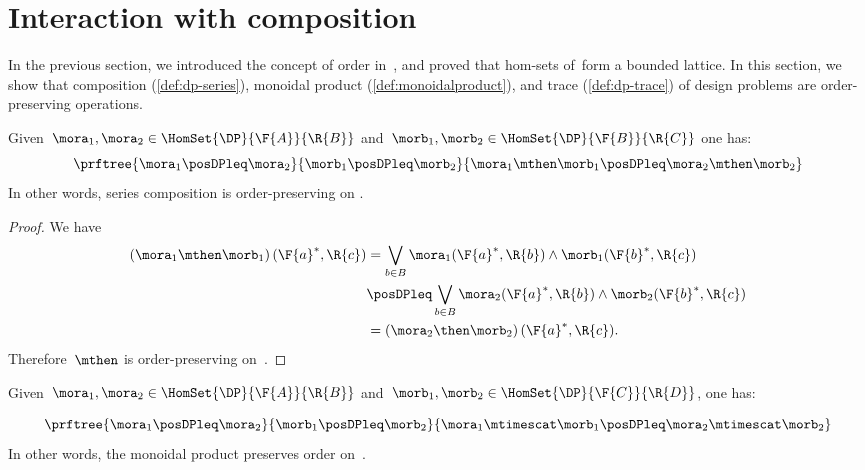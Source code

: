 

\section{Interaction with composition}


In the previous section, we introduced the concept of order in~\DP, and proved that hom-sets of~\DP form a bounded lattice. In this section, we show that composition (\cref{def:dp-series}), monoidal product (\cref{def:monoidalproduct}), and trace (\cref{def:dp-trace}) of design problems are order-preserving operations.
\begin{lemma}
  \label{lem:series_pres_order}
  Given~$\mora_1,\mora_2 \in \HomSet{\DP}{\F{A}}{\R{B}}$ and~$\morb_1,\morb_2 \in \HomSet{\DP}{\F{B}}{\R{C}}$ one has:
  \begin{equation}
    \prftree{\mora_1\posDPleq \mora_2}{\morb_1\posDPleq \morb_2}{\mora_1\mthen \morb_1 \posDPleq \mora_2\mthen \morb_2}
  \end{equation}
In other words, series composition is order-preserving on \DP.
\end{lemma}

\begin{proof}
  We have
  \begin{equation}
   \label{eq:series_pres_ord}
    \begin{aligned}
      \left( \mora_1\mthen \morb_1\right)(\F{a}^*,\R{c})&=\bigvee_{b\in B}\mora_1(\F{a}^*,\R{b})\wedge \morb_1(\F{b}^*,\R{c})\\
      &\posDPleq \bigvee_{b\in B} \mora_2(\F{a}^*,\R{b})\wedge \morb_2(\F{b}^*,\R{c})\\
      &=\left( \mora_2\then \morb_2\right)(\F{a}^*,\R{c}).
    \end{aligned}
  \end{equation}
  Therefore~$\mthen$ is order-preserving on~\DP.
\end{proof}

\begin{lemma}
  \label{lem:tens_pres_order}
  Given~$\mora_1,\mora_2 \in \HomSet{\DP}{\F{A}}{\R{B}}$ and~$\morb_1,\morb_2 \in \HomSet{\DP}{\F{C}}{\R{D}}$, one has:

 \begin{equation}
   \prftree{\mora_1\posDPleq \mora_2}{\morb_1\posDPleq \morb_2}{\mora_1\mtimescat \morb_1 \posDPleq \mora_2\mtimescat \morb_2}
\end{equation}In other words, the monoidal product preserves order on~\DP.
\end{lemma}

